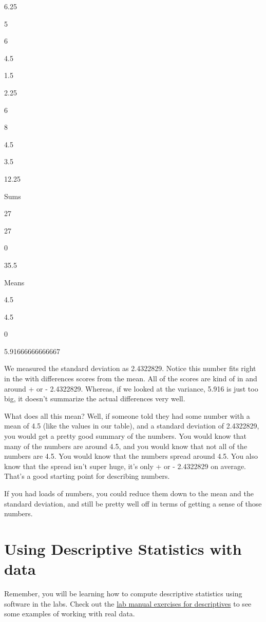 \documentclass[]{book}
\begin{document}
6.25

5

6

4.5

1.5

2.25

6

8

4.5

3.5

12.25

Sums

27

27

0

35.5

Means

4.5

4.5

0

5.91666666666667

We measured the standard deviation as 2.4322829. Notice this number fits right in the with differences scores from the mean. All of the scores are kind of in and around + or - 2.4322829. Whereas, if we looked at the variance, 5.916 is just too big, it doesn't summarize the actual differences very well.

What does all this mean? Well, if someone told they had some number with a mean of 4.5 (like the values in our table), and a standard deviation of 2.4322829, you would get a pretty good summary of the numbers. You would know that many of the numbers are around 4.5, and you would know that not all of the numbers are 4.5. You would know that the numbers spread around 4.5. You also know that the spread isn't super huge, it's only + or - 2.4322829 on average. That's a good starting point for describing numbers.

If you had loads of numbers, you could reduce them down to the mean and the standard deviation, and still be pretty well off in terms of getting a sense of those numbers.

\hypertarget{using-descriptive-statistics-with-data}{%
\section{Using Descriptive Statistics with data}\label{using-descriptive-statistics-with-data}}

Remember, you will be learning how to compute descriptive statistics using software in the labs. Check out the \href{https://crumplab.github.io/statisticsLab/lab-2-descriptive-statistics.html}{lab manual exercises for descriptives} to see some examples of working with real data.
\end{document}
